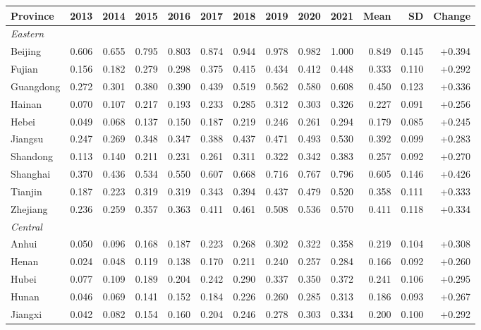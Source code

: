 \begin{tabular}{lrrrrrrrrrrrr}
\toprule
Province & 2013 & 2014 & 2015 & 2016 & 2017 & 2018 & 2019 & 2020 & 2021 & Mean & SD & Change \\
\midrule
\multicolumn{13}{l}{\textit{Eastern}} \\
Beijing & 0.606 & 0.655 & 0.795 & 0.803 & 0.874 & 0.944 & 0.978 & 0.982 & 1.000 & 0.849 & 0.145 & +0.394 \\
Fujian & 0.156 & 0.182 & 0.279 & 0.298 & 0.375 & 0.415 & 0.434 & 0.412 & 0.448 & 0.333 & 0.110 & +0.292 \\
Guangdong & 0.272 & 0.301 & 0.380 & 0.390 & 0.439 & 0.519 & 0.562 & 0.580 & 0.608 & 0.450 & 0.123 & +0.336 \\
Hainan & 0.070 & 0.107 & 0.217 & 0.193 & 0.233 & 0.285 & 0.312 & 0.303 & 0.326 & 0.227 & 0.091 & +0.256 \\
Hebei & 0.049 & 0.068 & 0.137 & 0.150 & 0.187 & 0.219 & 0.246 & 0.261 & 0.294 & 0.179 & 0.085 & +0.245 \\
Jiangsu & 0.247 & 0.269 & 0.348 & 0.347 & 0.388 & 0.437 & 0.471 & 0.493 & 0.530 & 0.392 & 0.099 & +0.283 \\
Shandong & 0.113 & 0.140 & 0.211 & 0.231 & 0.261 & 0.311 & 0.322 & 0.342 & 0.383 & 0.257 & 0.092 & +0.270 \\
Shanghai & 0.370 & 0.436 & 0.534 & 0.550 & 0.607 & 0.668 & 0.716 & 0.767 & 0.796 & 0.605 & 0.146 & +0.426 \\
Tianjin & 0.187 & 0.223 & 0.319 & 0.319 & 0.343 & 0.394 & 0.437 & 0.479 & 0.520 & 0.358 & 0.111 & +0.333 \\
Zhejiang & 0.236 & 0.259 & 0.357 & 0.363 & 0.411 & 0.461 & 0.508 & 0.536 & 0.570 & 0.411 & 0.118 & +0.334 \\
\midrule
\multicolumn{13}{l}{\textit{Central}} \\
Anhui & 0.050 & 0.096 & 0.168 & 0.187 & 0.223 & 0.268 & 0.302 & 0.322 & 0.358 & 0.219 & 0.104 & +0.308 \\
Henan & 0.024 & 0.048 & 0.119 & 0.138 & 0.170 & 0.211 & 0.240 & 0.257 & 0.284 & 0.166 & 0.092 & +0.260 \\
Hubei & 0.077 & 0.109 & 0.189 & 0.204 & 0.242 & 0.290 & 0.337 & 0.350 & 0.372 & 0.241 & 0.106 & +0.295 \\
Hunan & 0.046 & 0.069 & 0.141 & 0.152 & 0.184 & 0.226 & 0.260 & 0.285 & 0.313 & 0.186 & 0.093 & +0.267 \\
Jiangxi & 0.042 & 0.082 & 0.154 & 0.160 & 0.204 & 0.246 & 0.278 & 0.303 & 0.334 & 0.200 & 0.100 & +0.292 \\

\end{tabular}
